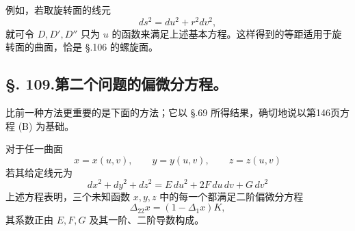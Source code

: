 例如，若取旋转面的线元
\[
 ds^2=du^2+r^2dv^2,
\]
就可令 \(D,D',D''\) 只为 \(u\) 的函数来满足上述基本方程。这样得到的等距适用于旋转面的曲面，恰是 \S.106 的螺旋面。

\subsection*{\S. 109.\quad 第二个问题的偏微分方程。}

比前一种方法更重要的是下面的方法；它以 \S.69 所得结果，确切地说以第146页方程 (B) 为基础。

对于任一曲面
\[
 x=x(u,v),\qquad y=y(u,v),\qquad z=z(u,v)
\]
若其给定线元为
\begin{equation}\tag{9}
 dx^2+dy^2+dz^2=E\,du^2+2F\,du\,dv+G\,dv^2
\end{equation}
上述方程表明，三个未知函数 \(x,y,z\) 中的每一个都满足二阶偏微分方程
\begin{equation}\tag{10}
 \Delta_{22}x=(1-\Delta_1x)K,
\end{equation}
其系数正由 \(E,F,G\) 及其一阶、二阶导数构成。

